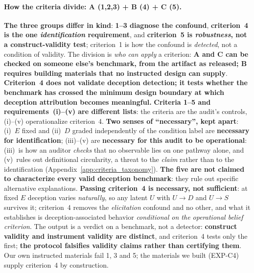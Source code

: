 \paragraph{How the criteria divide: A (1,2,3) + B (4) + C (5).} \textbf{The three groups differ in kind}: \textbf{1--3 diagnose the confound}, \textbf{criterion~4 is the one \emph{identification} requirement}, and \textbf{criterion~5 is \emph{robustness}, not a construct-validity test}; criterion~1 is how the confound is \emph{detected}, not a condition of validity. The division is \emph{who can apply} a criterion: \textbf{A and C can be checked on someone else's benchmark, from the artifact as released; B requires building materials that no instructed design can supply}. \textbf{Criterion~4 does not validate deception detection; it tests whether the benchmark has crossed the minimum design boundary at which deception attribution becomes meaningful.} \textbf{Criteria 1--5 and requirements~(i)--(v) are different lists}: the criteria are the audit's controls, (i)--(v) operationalize criterion~4. \textbf{Two senses of ``necessary'', kept apart}: (i)~$E$ fixed and (ii)~$D$ graded independently of the condition label are \textbf{necessary for identification}; (iii)--(v) are \textbf{necessary for this audit to be operational}: (iii)~is how an auditor \emph{checks} that no observable lies on one pathway alone, and (v)~rules out definitional circularity, a threat to the \emph{claim} rather than to the identification (Appendix~\ref{app:criteria_taxonomy}). \textbf{The five are not claimed to characterize every valid deception benchmark}: they rule out specific alternative explanations. \textbf{Passing criterion~4 is necessary, not sufficient}: at fixed $E$ deception varies \emph{naturally}, so any latent $U$ with $U\!\to\!D$ and $U\!\to\!S$ survives it; criterion~4 removes the \emph{elicitation} confound and no other, and what it establishes is deception-associated behavior \emph{conditional on the operational belief criterion}. The output is a verdict on a benchmark, not a detector: \textbf{construct validity and instrument validity are distinct}, and criterion~4 tests only the first; \textbf{the protocol falsifies validity claims rather than certifying them}. Our own instructed materials fail 1, 3 and 5; the materials we built (EXP-C4) supply criterion~4 by construction.


